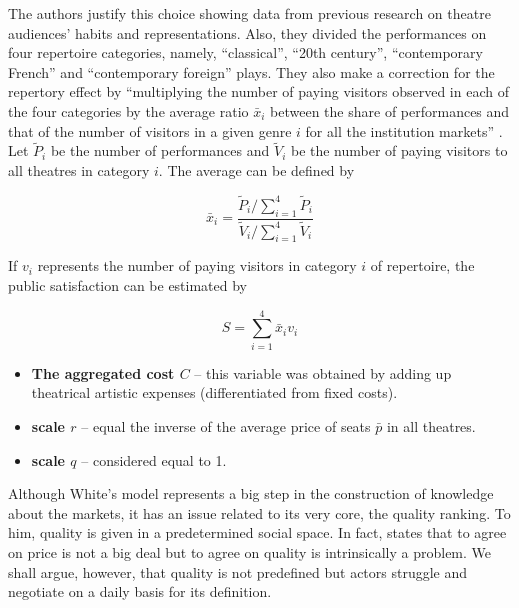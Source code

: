 \documentclass[a4paper, 12pt, openright, oneside, german, french, brazil, english]{abntex2}
\begin{document}
	The authors justify this choice showing data from previous research on theatre audiences' habits and representations. Also, they divided the performances on four repertoire categories, namely, ``classical'', ``20th century'', ``contemporary French'' and ``contemporary foreign'' plays. They also make a correction for the repertory effect by ``multiplying the number of paying visitors observed  in each of the four categories by the average ratio $\bar{x}_i$ between the share of performances and that of the number of visitors in a given genre $i$ for all the institution markets'' \cite[p. 265]{biencourt2002market}. Let $\tilde{P}_i$ be the number of performances and $\tilde{V}_i$ be the number of paying visitors to all theatres in category $i$. The average can be defined by
	
	\begin{equation}
	\label{repertory-effect-correction}
		\bar{x}_i = \frac{\tilde{P}_i / \sum_{i=1}^{4}\tilde{P}_i}{\tilde{V}_i / \sum_{i=1}^{4}\tilde{V}_i}	
	\end{equation}
	
	If $v_i$ represents the number of paying visitors in category $i$ of repertoire, the public satisfaction can be estimated by
	
	\begin{equation}
	\label{satisfaction-corrected}
		S = \sum_{i=1}^{4}\bar{x}_i v_i
	\end{equation}
	
	
	
	\begin{itemize}
		\item \textbf{The aggregated cost $C$} -- this variable was obtained by adding up theatrical artistic expenses (differentiated from fixed costs).
		
		\item \textbf{scale $r$} -- equal the inverse of the average price of seats $\bar{p}$ in all theatres.
		
		\item \textbf{scale $q$} -- considered equal to 1.
	\end{itemize}



        Although White's model represents a big step in the construction of knowledge about the markets, it has an issue related to its very core, the quality ranking. To him, quality is given in a predetermined social space. In fact,  states that to agree on price is not a big deal but to agree on quality is intrinsically a problem. We shall argue, however, that quality is not predefined but actors struggle and negotiate on a daily basis for its definition.
\end{document}
